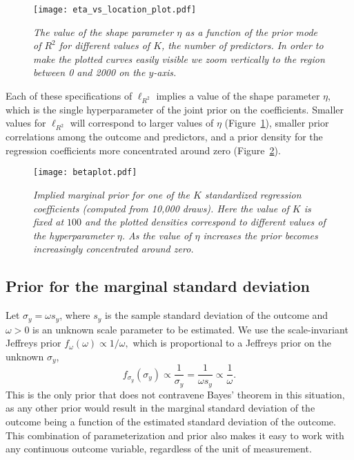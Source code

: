 \documentclass[11pt]{article}
\newcommand{\locRsq}{\ell_{R^2}}
\begin{document}
\begin{figure}
\centering
\texttt{[image: eta\_vs\_location\_plot.pdf]}{\vspace{-.25cm}}
\caption{\em \small The value of the shape parameter $\eta$ as a function of
the prior mode of $R^2$ for different values of $K$, the number of predictors.
In order to make the plotted curves easily visible we zoom vertically to the
region between 0 and 2000 on the $y$-axis.}
\label{fig:etavslocplot}
\end{figure}

Each of these specifications of $\locRsq$ implies a value of the shape parameter
$\eta$, which is the single hyperparameter of the joint prior on the
coefficients. Smaller values for $\locRsq$ will correspond to larger values of
$\eta$ (Figure~\ref{fig:etavslocplot}), smaller prior correlations among the
outcome and predictors, and a prior density for the regression coefficients more
concentrated around zero (Figure~\ref{fig:betaplot}).

\begin{figure}
\centering
\texttt{[image: betaplot.pdf]}{\vspace{-.25cm}}
\caption{\em \small Implied marginal prior for one of the $K$ standardized
regression coefficients (computed from 10,000 draws). Here the value of $K$ is
fixed at $100$ and the plotted densities correspond to different values of the
hyperparameter $\eta$. As the value of $\eta$ increases the prior becomes
increasingly concentrated around zero.}
\label{fig:betaplot}
\end{figure}

\subsection{Prior for the marginal standard deviation}
\label{subsec:marginalSD}
Let $\sigma_y = \omega s_y$, where $s_y$ is the sample standard deviation of the
outcome and $\omega > 0$ is an unknown scale parameter to be estimated. We use
the scale-invariant Jeffreys prior
$f_\omega \left(\omega\right) \propto 1 / \omega,$
which is proportional to a Jeffreys prior on the unknown $\sigma_y$,
$$f_{\sigma_y} \left(\sigma_y\right) \propto \frac{1}{\sigma_y}
= \frac{1}{\omega s_y} \propto \frac{1}{\omega}.$$
This is the only prior that does not contravene Bayes' theorem in this
situation, as any other prior would result in the marginal standard deviation of
the outcome being a function of the estimated standard deviation of the outcome.
This combination of parameterization and prior also makes it easy to work with
any continuous outcome variable, regardless of the unit of measurement.
\end{document}
